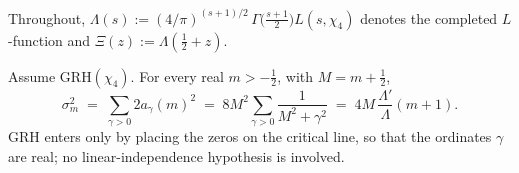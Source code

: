 Throughout, $\Lambda(s):=(4/\pi)^{(s+1)/2}\,\Gamma\!\bigl(\tfrac{s+1}2\bigr)
L(s,\chi_4)$ denotes the completed $L$-function and
$\Xi(z):=\Lambda(\tfrac12+z)$.

\begin{proposition}\label{prop:varid}
Assume GRH$(\chi_4)$. For every real $m>-\tfrac12$, with $M=m+\tfrac12$,
\begin{equation}\label{eq:varid}
\sigma_m^2\;=\;\sum_{\gamma>0}2a_\gamma(m)^2
\;=\;8M^2\sum_{\gamma>0}\frac{1}{M^2+\gamma^2}
\;=\;4M\,\frac{\Lambda'}{\Lambda}(m+1).
\end{equation}
GRH enters only by placing the zeros on the critical line, so that the
ordinates $\gamma$ are real; no linear-independence hypothesis is
involved.
\end{proposition}

